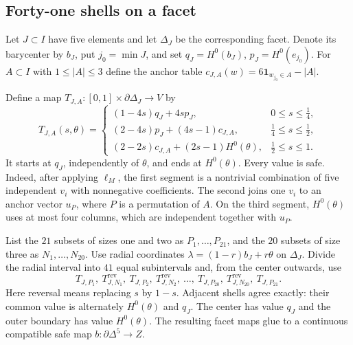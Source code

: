 \documentclass[a4paper,11pt,reqno]{amsart}
\newcommand{\one}{\mathbf 1}
\theoremstyle{definition}
\theoremstyle{remark}
\numberwithin{equation}{section}
\begin{document}
\subsection{Forty-one shells on a facet}
Let $J\subset I$ have five elements and let $\Delta_J$ be the corresponding
facet. Denote its barycenter by $b_J$, put $j_0=\min J$, and set
$q_J=H^0(b_J)$, $p_J=H^0(e_{j_0})$. For $A\subset I$ with
$1\le|A|\le3$ define the anchor table
$c_{J,A}(w)=6\one_{w_{j_0}\in A}-|A|$.

Define a map $T_{J,A}:[0,1]\times\partial\Delta_J\to V$ by
\begin{equation}\label{eq:anchor}
T_{J,A}(s,\theta)=
\begin{cases}
 (1-4s)q_J+4sp_J,&0\le s\le\tfrac14,\\
 (2-4s)p_J+(4s-1)c_{J,A},&\tfrac14\le s\le\tfrac12,\\
 (2-2s)c_{J,A}+(2s-1)H^0(\theta),&\tfrac12\le s\le1.
\end{cases}
\end{equation}
It starts at $q_J$, independently of $\theta$, and ends at $H^0(\theta)$.
Every value is safe. Indeed, after applying $\ell_M$, the first segment
is a nontrivial combination of five independent $v_i$ with nonnegative
coefficients. The second joins one $v_i$ to an anchor vector $u_P$,
where $P$ is a permutation of $A$. On the third segment, $H^0(\theta)$
uses at most four columns, which are independent together with $u_P$.

List the $21$ subsets of sizes one and two as $P_1,\ldots,P_{21}$,
and the $20$ subsets of size three as $N_1,\ldots,N_{20}$. Use radial
coordinates $\lambda=(1-r)b_J+r\theta$ on $\Delta_J$. Divide the radial
interval into $41$ equal subintervals and, from the center outwards,
use
\begin{equation}\label{eq:shells}
 T_{J,P_1},\ T_{J,N_1}^{\mathrm{rev}},\ T_{J,P_2},\
 T_{J,N_2}^{\mathrm{rev}},\ \ldots,\
 T_{J,P_{20}},\ T_{J,N_{20}}^{\mathrm{rev}},\ T_{J,P_{21}}.
\end{equation}
Here reversal means replacing $s$ by $1-s$. Adjacent shells agree
exactly: their common value is alternately $H^0(\theta)$ and $q_J$.
The center has value $q_J$ and the outer boundary has value $H^0(\theta)$.
The resulting facet maps glue to a continuous compatible safe map
$b:\partial\Delta^5\to Z$.
\end{document}
